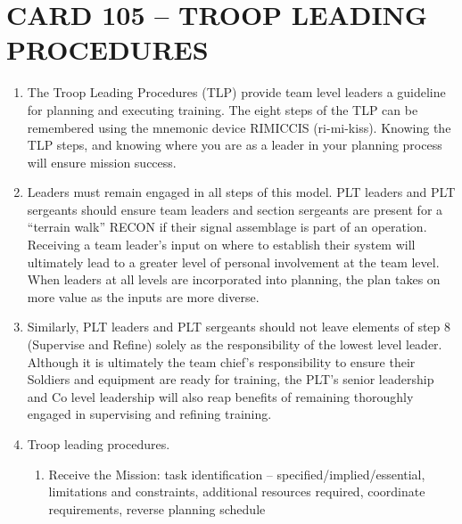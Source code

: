 \documentclass{article}
\begin{document}
\section*{CARD 105 – TROOP LEADING PROCEDURES}
\begin{enumerate}
    \item The Troop Leading Procedures (TLP) provide team level leaders a guideline for planning and executing training. The eight steps of the TLP can be remembered using the mnemonic device RIMICCIS (ri-mi-kiss). Knowing the TLP steps, and knowing where you are as a leader in your planning process will ensure mission success. 

\item Leaders must remain engaged in all steps of this model. PLT leaders and PLT sergeants should ensure team leaders and section sergeants are present for a “terrain walk” RECON if their signal assemblage is part of an operation. Receiving a team leader’s input on where to establish their system will ultimately lead to a greater level of personal involvement at the team level. When leaders at all levels are incorporated into planning, the plan takes on more value as the inputs are more diverse. 
\item Similarly, PLT leaders and PLT sergeants should not leave elements of step 8 (Supervise and Refine) solely as the responsibility of the lowest level leader. Although it is ultimately the team chief’s responsibility to ensure their Soldiers and equipment are ready for training, the PLT’s senior leadership and Co level leadership will also reap benefits of remaining thoroughly engaged in supervising and refining training.

\item Troop leading procedures.
\begin{enumerate}
    \item Receive the Mission: task identification – specified/implied/essential, limitations and constraints, additional resources required, coordinate requirements, reverse planning schedule


\end{enumerate}
\end{enumerate}
\end{document}
